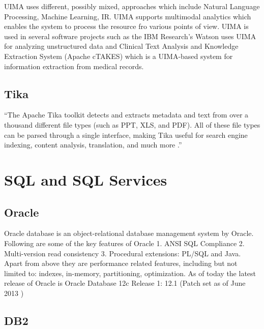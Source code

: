      UIMA uses different, possibly mixed, approaches which include
     Natural Language Processing, Machine Learning, IR. UIMA supports
     multimodal analytics \cite{www-uima-slideshare} which enables
     the system to process the resource fro various points of
     view. UIMA is used in several software projects such as the IBM
     Research's Watson uses UIMA for analyzing unstructured data and
     Clinical Text Analysis and Knowledge Extraction System (Apache
     cTAKES) which is a UIMA-based system for information extraction
     from medical records.
     
\subsection{Tika}

     ``The Apache Tika toolkit detects and extracts metadata and text
     from over a thousand different file types (such as PPT, XLS, and
     PDF). All of these file types can be parsed through a single
     interface, making Tika useful for search engine indexing, content
     analysis, translation, and much more \cite{www-tika}.''


\section{SQL and SQL Services}
\label{S:o-sql}

\subsection{Oracle}

     Oracle database is an object-relational database management system by 
     Oracle. Following are some of the key features of Oracle \cite{www-oracle}
     1. ANSI SQL Compliance
     2. Multi-version read consistency
     3. Procedural extensions: PL/SQL and Java.
     Apart from above they are performance related features, including but not 
     limited to: indexes, in-memory, partitioning, optimization. 
     As of today the latest release of Oracle is \cite{www-oracle}
     Oracle Database 12c Release 1: 12.1 (Patch set as of June 2013 )


\subsection{DB2}

